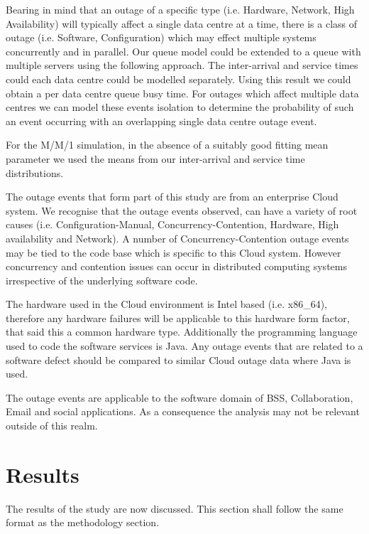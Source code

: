 \documentclass[5p]{elsarticle}
\begin{document}
Bearing in mind that an outage of a specific type (i.e. Hardware, Network, High Availability) will typically affect a single data centre at a time, there is a class of outage (i.e. Software, Configuration) which may effect multiple systems concurrently and in parallel. Our queue model could be extended to a queue with multiple servers using the following approach. The inter-arrival and service times could each data centre could be modelled separately. Using this result we could obtain a per data centre queue busy time. For outages which affect multiple data centres we can model these events isolation to determine the probability of such an event occurring with an overlapping single data centre outage event.

For the M/M/1 simulation, in the absence of a suitably good fitting mean parameter we used the means from our inter-arrival and service time distributions.

The outage events that form part of this study are from an enterprise Cloud system. We recognise that the outage events observed, can have a variety of root causes (i.e. Configuration-Manual, Concurrency-Contention, Hardware, High availability and Network). A number of Concurrency-Contention outage events may be tied to the code base which is specific to this Cloud system. However concurrency and contention issues can occur in distributed computing systems irrespective of the underlying software code.

The hardware used in the Cloud environment is Intel based (i.e. x86\_64), therefore any hardware failures will be applicable to this hardware form factor, that said this a common hardware type. Additionally the programming language used to code the software services is Java. Any outage events that are related to a software defect should be compared to similar Cloud outage data where Java is used.

The outage events are applicable to the software domain of BSS, Collaboration, Email and social applications. As a consequence the analysis may not be relevant outside of this realm.

\section{Results}
The results of the study are now discussed. This section shall follow the same format as the methodology section.
\end{document}
